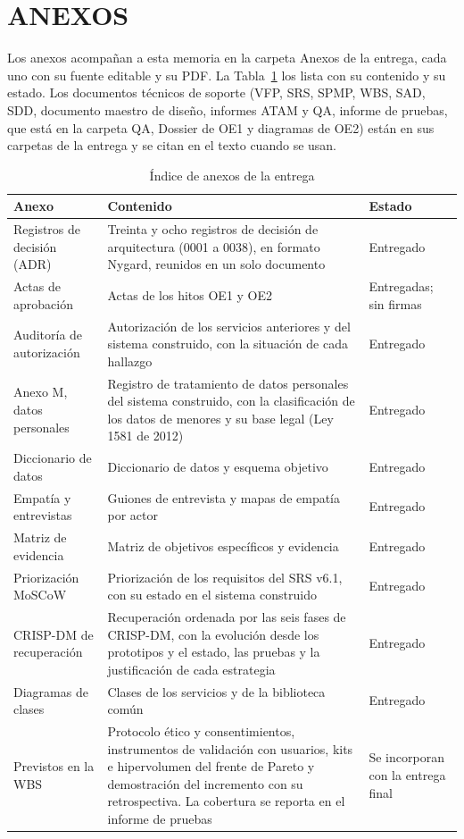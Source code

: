 \section{ANEXOS}

Los anexos acompañan a esta memoria en la carpeta Anexos de la entrega, cada uno con su fuente
editable y su PDF. La Tabla~\ref{tab:anexos} los lista con su contenido y su estado. Los
documentos técnicos de soporte (VFP, SRS, SPMP, WBS, SAD, SDD, documento maestro de diseño,
informes ATAM y QA, informe de pruebas, que está en la carpeta QA, Dossier de OE1 y diagramas
de OE2) están en sus carpetas de la entrega y se citan en el texto cuando se usan.

\begin{table}[htbp]
\centering
\caption{Índice de anexos de la entrega}
\label{tab:anexos}
\small
\renewcommand{\arraystretch}{1.2}
\begin{tabular}{@{}p{4.2cm}p{7.4cm}p{2.4cm}@{}}
\toprule
\textbf{Anexo} & \textbf{Contenido} & \textbf{Estado} \\
\midrule
Registros de decisión (ADR) & Treinta y ocho registros de decisión de arquitectura (0001 a 0038),
  en formato Nygard, reunidos en un solo documento & Entregado \\
\addlinespace
Actas de aprobación & Actas de los hitos OE1 y OE2 & Entregadas; sin firmas \\
\addlinespace
Auditoría de autorización & Autorización de los servicios anteriores y del sistema construido,
  con la situación de cada hallazgo & Entregado \\
\addlinespace
Anexo M, datos personales & Registro de tratamiento de datos personales del sistema
  construido, con la clasificación de los datos de menores y su base legal (Ley 1581 de 2012) &
  Entregado \\
\addlinespace
Diccionario de datos & Diccionario de datos y esquema objetivo & Entregado \\
\addlinespace
Empatía y entrevistas & Guiones de entrevista y mapas de empatía por actor & Entregado \\
\addlinespace
Matriz de evidencia & Matriz de objetivos específicos y evidencia & Entregado \\
\addlinespace
Priorización MoSCoW & Priorización de los requisitos del SRS v6.1, con su estado en el sistema
  construido & Entregado \\
\addlinespace
CRISP-DM de recuperación & Recuperación ordenada por las seis fases de CRISP-DM, con la
  evolución desde los prototipos y el estado, las pruebas y la justificación de cada
  estrategia & Entregado \\
\addlinespace
Diagramas de clases & Clases de los servicios y de la biblioteca común & Entregado \\
\midrule
Previstos en la WBS & Protocolo ético y consentimientos, instrumentos de validación con
  usuarios, kits e hipervolumen del frente de Pareto y demostración del incremento con su
  retrospectiva. La cobertura se reporta en el informe de pruebas & Se incorporan con la entrega final \\
\bottomrule
\end{tabular}
\end{table}

